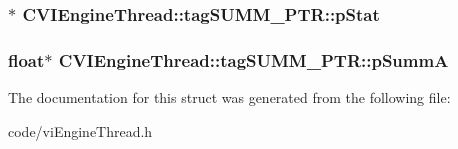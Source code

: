 \hypertarget{struct_c_v_i_engine_thread_1_1tag_s_u_m_m___p_t_r_a6191d3122464142f39ce9f4915bab62d}{
\subsubsection[{p\+Stat}]{$\ast$ C\+V\+I\+Engine\+Thread\+::tag\+S\+U\+M\+M\+\_\+\+P\+T\+R\+::p\+Stat}}\label{struct_c_v_i_engine_thread_1_1tag_s_u_m_m___p_t_r_a6191d3122464142f39ce9f4915bab62d}




\hypertarget{struct_c_v_i_engine_thread_1_1tag_s_u_m_m___p_t_r_a126884c9b05358fd2bbcf2dbde7c242a}{
\subsubsection[{p\+Summ\+A}]{\setlength{\rightskip}{0pt plus 5cm}float$\ast$ C\+V\+I\+Engine\+Thread\+::tag\+S\+U\+M\+M\+\_\+\+P\+T\+R\+::p\+Summ\+A}}\label{struct_c_v_i_engine_thread_1_1tag_s_u_m_m___p_t_r_a126884c9b05358fd2bbcf2dbde7c242a}






The documentation for this struct was generated from the following file\+:\begin{DoxyCompactItemize}
\item 
code/vi\+Engine\+Thread.\+h\end{DoxyCompactItemize}
